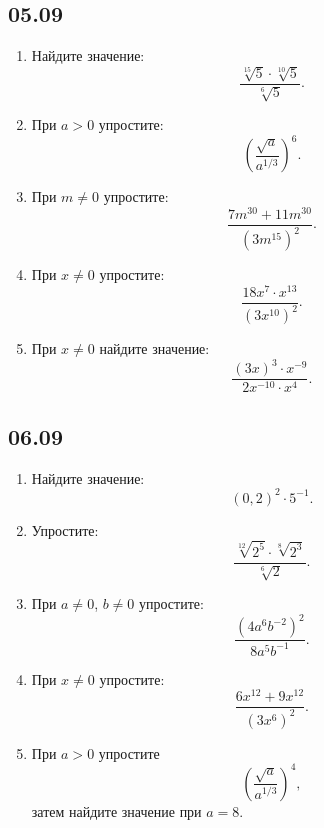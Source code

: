 \documentclass[a4paper,12pt]{article}
\begin{document}
\subsection*{05.09}
\begin{enumerate}[label=\textbf{\arabic*.}]
\item Найдите значение: \[\frac{\sqrt[15]{5}\cdot\sqrt[10]{5}}{\sqrt[6]{5}}.\]
\item При \(a>0\) упростите: \[\left(\frac{\sqrt a}{a^{1/3}}\right)^6.\]
\item При \(m\ne0\) упростите: \[\frac{7m^{30}+11m^{30}}{(3m^{15})^2}.\]
\item При \(x\ne0\) упростите: \[\frac{18x^7\cdot x^{13}}{(3x^{10})^2}.\]
\item При \(x\ne0\) найдите значение: \[\frac{(3x)^3\cdot x^{-9}}{2x^{-10}\cdot x^4}.\]
\end{enumerate}

\subsection*{06.09}
\begin{enumerate}[label=\textbf{\arabic*.}]
\item Найдите значение: \[(0{,}2)^2\cdot5^{-1}.\]
\item Упростите: \[\frac{\sqrt[12]{2^5}\cdot\sqrt[8]{2^3}}{\sqrt[6]{2}}.\]
\item При \(a\ne0\), \(b\ne0\) упростите: \[\frac{(4a^6b^{-2})^2}{8a^5b^{-1}}.\]
\item При \(x\ne0\) упростите: \[\frac{6x^{12}+9x^{12}}{(3x^6)^2}.\]
\item При \(a>0\) упростите \[\left(\frac{\sqrt a}{a^{1/3}}\right)^4,\] затем найдите значение при \(a=8\).
\end{enumerate}

\clearpage
\end{document}

